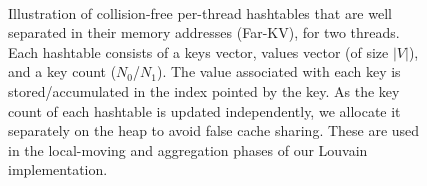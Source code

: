\begin{figure}[hbtp]
  \centering
   \\[-2ex]
  \caption{Illustration of collision-free per-thread hashtables that are well separated in their memory addresses (Far-KV), for two threads. Each hashtable consists of a keys vector, values vector (of size $|V|$), and a key count ($N_0$/$N_1$). The value associated with each key is stored/accumulated in the index pointed by the key. As the key count of each hashtable is updated independently, we allocate it separately on the heap to avoid false cache sharing. These are used in the local-moving and aggregation phases of our Louvain implementation.}
  \label{fig:louvain-hashtable}
\end{figure}
